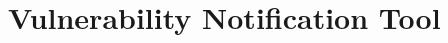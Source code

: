 \chapter{Vulnerability Notification Tool}
\label{chap5-vulnerability-notification-tool}
\thispagestyle{empty}



